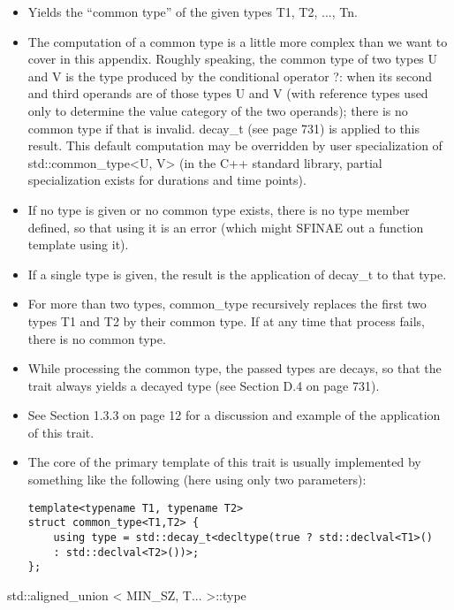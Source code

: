 \begin{itemize}
\item
Yields the “common type” of the given types T1, T2, ..., Tn.

\item
The computation of a common type is a little more complex than we want to cover in this appendix. Roughly speaking, the common type of two types U and V is the type produced by the conditional operator ?: when its second and third operands are of those types U and V (with reference types used only to determine the value category of the two operands); there is no common type if that is invalid. decay\_t (see page 731) is applied to this result. This default computation may be overridden by user specialization of std::common\_type<U, V> (in the C++ standard library, partial specialization exists for durations and time points).

\item
If no type is given or no common type exists, there is no type member defined, so that using it is an error (which might SFINAE out a function template using it).

\item
If a single type is given, the result is the application of decay\_t to that type.

\item
For more than two types, common\_type recursively replaces the first two types T1 and T2 by their common type. If at any time that process fails, there is no common type.

\item
While processing the common type, the passed types are decays, so that the trait always yields a decayed type (see Section D.4 on page 731).

\item
See Section 1.3.3 on page 12 for a discussion and example of the application of this trait.

\item
The core of the primary template of this trait is usually implemented by something like the following (here using only two parameters):
\begin{lstlisting}[style=styleCXX]
template<typename T1, typename T2>
struct common_type<T1,T2> {
	using type = std::decay_t<decltype(true ? std::declval<T1>()
	: std::declval<T2>())>;
};
\end{lstlisting}
\end{itemize}

std::aligned\_union < MIN\_SZ, T... >::type

